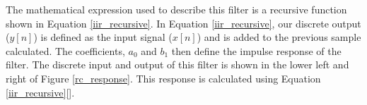 








The mathematical expression used to describe this filter is a recursive function shown in Equation \ref{iir_recursive}.  In Equation \ref{iir_recursive}, our discrete output ($y[n]$) is defined as the input signal ($x[n]$) and is added to the previous sample calculated.  The coefficients, $a_0$ and $b_1$ then define the impulse response of the filter.  The discrete input and output of this filter is shown in the lower left and right of  Figure \ref{rc_response}.  This response is calculated using Equation \ref{iir_recursive}[\cite{smith1997scientist}].

